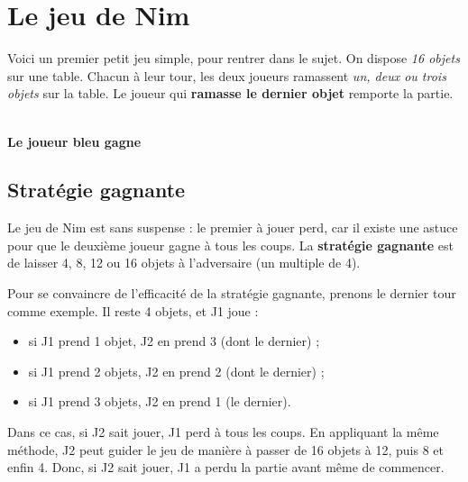 \chapter*{Le jeu de Nim}

Voici un premier petit jeu simple, pour rentrer dans le sujet. On dispose
\textit{16 objets} sur une table. Chacun à leur tour, les deux joueurs ramassent
\textit{un, deux ou trois objets} sur la table. Le joueur qui \textbf{ramasse le
  dernier objet} remporte la partie.

\bigskip
 

\bigskip
\bigskip
\bigskip

\begin{center}
 \\
\textbf{Le joueur bleu gagne}
\end{center}

\newpage

\section*{Stratégie gagnante}

Le jeu de Nim est sans suspense : le premier à jouer perd, car il existe une
astuce pour que le deuxième joueur gagne à tous les coups. La \textbf{stratégie
  gagnante} est de laisser 4, 8, 12 ou 16 objets à l'adversaire (un multiple de
4).

Pour se convaincre de l'efficacité de la stratégie gagnante, prenons le dernier
tour comme exemple. Il reste 4 objets, et J1 joue :

\begin{itemize}
  \item si J1 prend 1 objet, J2 en prend 3 (dont le dernier) ;
  \item si J1 prend 2 objets, J2 en prend 2 (dont le dernier) ;
  \item si J1 prend 3 objets, J2 en prend 1 (le dernier).
\end{itemize}        

Dans ce cas, si J2 sait jouer, J1 perd à tous les coups. En appliquant la même
méthode, J2 peut guider le jeu de manière à passer de 16 objets à 12, puis 8 et
enfin 4. Donc, si J2 sait jouer, J1 a perdu la partie avant même de commencer.


